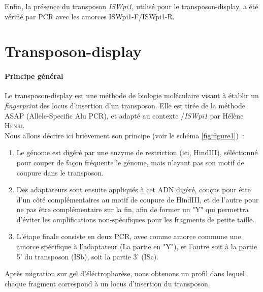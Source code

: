 
Enfin, la présence du transposon \textit{ISWpi1}, utilisé pour le transposon-display, a été vérifié par PCR avec les amorces ISWpi1-F/ISWpi1-R.

\section{Transposon-display} %
\label{sec:transposon_display}

	\paragraph{Principe général} %
	\label{par:principe_TnDisp}
	Le transposon-display est une méthode de biologie moléculaire visant à établir un \textit{fingerprint} des locus d’insertion d’un transposon. 
	Elle est tirée de la méthode ASAP (Allele-Specific Alu PCR)\cite{ASAP}, et adapté au contexte /\textit{ISWpi1} par Hélène \textsc{Henri}\cite{memHH}.\\
	Nous allons décrire ici brièvement son principe (voir le schéma \ref{fig:figure1})~:
	\begin{enumerate}
		\item Le génome est digéré par une enzyme de restriction (ici, HindIII), séléctionné pour couper de façon fréquente le génome, mais n’ayant pas son motif de coupure dans le transposon.
		\item Des adaptateurs
		sont ensuite appliqués à cet ADN digéré, conçus pour être d’un côté complémentaires au motif de coupure de HindIII, et de l’autre pour ne pas être complémentaire sur la fin, afin de former un "Y" qui permettra d’éviter les amplifications non-spécifiques pour les fragments de petite taille.
		\item L’étape finale consiste en deux PCR, avec comme amorce commune une amorce spécifique à l’adaptateur (La partie en "Y"), et l’autre soit à la partie 5’ du transposon (ISb), soit la partie 3’ (ISc).
	\end{enumerate}
	Après migration sur gel d’éléctrophorèse, nous obtenons un profil dans lequel chaque fragment correspond à un locus d’insertion du transposon.

